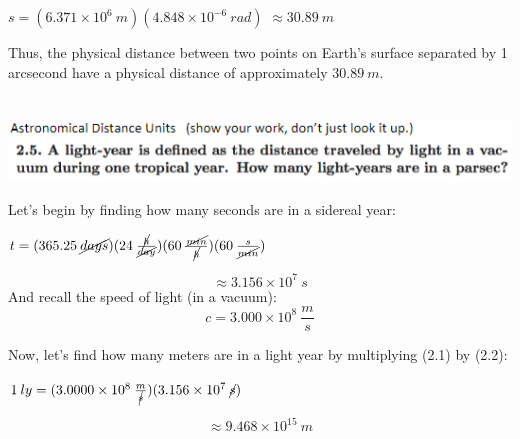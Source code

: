 \documentclass{article}
\begin{document}
\begin{center}
    $s = (6.371\times10^{6}\:m)(4.848\times10^{-6}\:rad)$
    \newline
    $\approx 30.89\: m$
\end{center}

Thus, the physical distance between two points on Earth's surface separated by 1 arcsecond have a physical distance of approximately $30.89\:m$.
\newline\newline

\section{}
\includegraphics[scale = 0.8]{problemset1q2.PNG}
\newline\newline

Let's begin by finding how many seconds are in a sidereal year:
\begin{center}
    $t = (365.25\:\cancel{days})(24\:\frac{\cancel{h}}{\cancel{day}})(60\:\frac{\cancel{min}}{\cancel{h}})(60\:\frac{s}{\cancel{min}})$
\end{center}
\begin{equation}
    \approx3.156\times10^{7}\:s
\end{equation}
\newline
And recall the speed of light (in a vacuum):
\begin{equation}
    c = 3.000\times10^{8}\:\frac{m}{s}
\end{equation}

Now, let's find how many meters are in a light year by multiplying (2.1) by (2.2):

\begin{center}
    $1\:ly = (3.0000\times10^{8}\:\frac{m}{\cancel{s}})(3.156\times10^{7}\:\cancel{s})$
\end{center}

\begin{equation}
    \approx 9.468\times10^{15}\:m
\end{equation}
\end{document}
